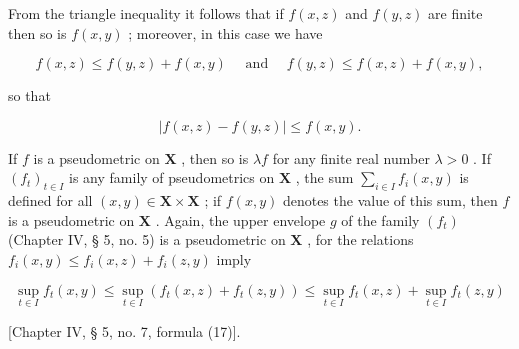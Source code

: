 From the triangle inequality it follows that if \(f(x, z)\) and \(f(y, z)\) are finite then so is \(f(x, y)\) ; moreover, in this case we have

\[
f (x, z) \leqslant f (y, z) + f (x, y) \quad \text { and } \quad f (y, z) \leqslant f (x, z) + f (x, y),
\]

so that

\[
\left| f (x, z) - f (y, z) \right| \leqslant f (x, y).\tag{1}
\]

If \(f\) is a pseudometric on \(\mathbf{X}\) , then so is \(\lambda f\) for any finite real number \(\lambda > 0\) . If \((f_t)_{t \in I}\) is any family of pseudometrics on \(\mathbf{X}\) , the sum \(\sum_{i \in I} f_i(x, y)\) is defined for all \((x, y) \in \mathbf{X} \times \mathbf{X}\) ; if \(f(x, y)\) denotes the value of this sum, then \(f\) is a pseudometric on \(\mathbf{X}\) . Again, the upper envelope \(g\) of the family \((f_t)\) (Chapter IV, § 5, no. 5) is a pseudometric on \(\mathbf{X}\) , for the relations \(f_i(x, y) \leqslant f_i(x, z) + f_i(z, y)\) imply

\[
\sup _ {t \in I} f _ {t} (x, y) \leqslant \sup _ {t \in I} \left(f _ {t} (x, z) + f _ {t} (z, y)\right) \leqslant \sup _ {t \in I} f _ {t} (x, z) + \sup _ {t \in I} f _ {t} (z, y)
\]

{[}Chapter IV, § 5, no. 7, formula (17){]}.

